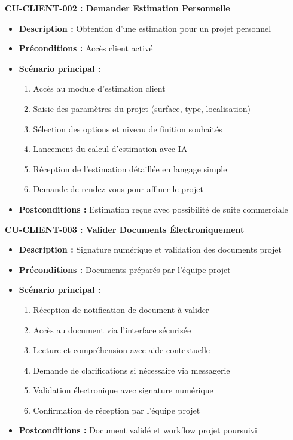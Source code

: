 \textbf{CU-CLIENT-002 : Demander Estimation Personnelle}
\begin{itemize}
    \item \textbf{Description :} Obtention d'une estimation pour un projet personnel
    \item \textbf{Préconditions :} Accès client activé
    \item \textbf{Scénario principal :}
    \begin{enumerate}
        \item Accès au module d'estimation client
        \item Saisie des paramètres du projet (surface, type, localisation)
        \item Sélection des options et niveau de finition souhaités
        \item Lancement du calcul d'estimation avec IA
        \item Réception de l'estimation détaillée en langage simple
        \item Demande de rendez-vous pour affiner le projet
    \end{enumerate}
    \item \textbf{Postconditions :} Estimation reçue avec possibilité de suite commerciale
\end{itemize}

\textbf{CU-CLIENT-003 : Valider Documents Électroniquement}
\begin{itemize}
    \item \textbf{Description :} Signature numérique et validation des documents projet
    \item \textbf{Préconditions :} Documents préparés par l'équipe projet
    \item \textbf{Scénario principal :}
    \begin{enumerate}
        \item Réception de notification de document à valider
        \item Accès au document via l'interface sécurisée
        \item Lecture et compréhension avec aide contextuelle
        \item Demande de clarifications si nécessaire via messagerie
        \item Validation électronique avec signature numérique
        \item Confirmation de réception par l'équipe projet
    \end{enumerate}
    \item \textbf{Postconditions :} Document validé et workflow projet poursuivi
\end{itemize}

